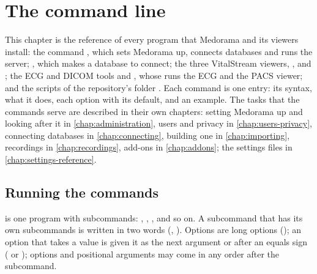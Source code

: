 \chapter{The command line}
\label{chap:cli}

This chapter is the reference of every program that Medorama and its viewers install: the
command , which sets Medorama up, connects databases and runs the server;
, which makes a database to connect; the three VitalStream viewers,
,  and ; the ECG and DICOM tools
 and , whose  runs the ECG and the PACS viewer; and the
scripts of the repository's folder . Each command is one entry: its syntax, what it
does, each option with its default, and an example. The tasks that the commands serve are
described in their own chapters: setting Medorama up and looking after it in
\cref{chap:administration}, users and privacy in \cref{chap:users-privacy}, connecting databases
in \cref{chap:connecting}, building one in \cref{chap:importing}, recordings in
\cref{chap:recordings}, add-ons in \cref{chap:addons}; the settings files in
\cref{chap:settings-reference}.

\section{Running the commands}
\label{sec:cli-running}

 is one program with subcommands: , ,
, and so on. A subcommand that has its own subcommands is written
in two words (, ). Options are long options
(); an option that takes a value is given it as the next argument or after
an equals sign ( or ); options and positional arguments may
come in any order after the subcommand.

